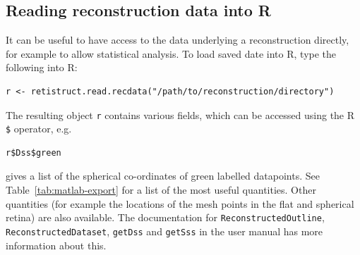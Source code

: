 \documentclass{article}
\begin{document}
\subsection{Reading reconstruction data into R}
\label{retistruct-user-guide:sec:reading-date-into}

It can be useful to have access to the data underlying a
reconstruction directly, for example to allow statistical analysis.
To load saved date into R, type the following into R:
\begin{verbatim}
r <- retistruct.read.recdata("/path/to/reconstruction/directory")
\end{verbatim}
The resulting object \texttt{r} contains various fields, which can be
accessed using the R \texttt{\$} operator, e.g.
\begin{verbatim}
r$Dss$green
\end{verbatim}
gives a list of the spherical co-ordinates of green labelled
datapoints. See Table~\ref{tab:matlab-export} for a list of the most
useful quantities. Other quantities (for example the locations of the
mesh points in the flat and spherical retina) are also available. The
documentation for \texttt{ReconstructedOutline},
\texttt{ReconstructedDataset}, \texttt{getDss} and \texttt{getSss} in
the user manual has more information about this.
\end{document}
